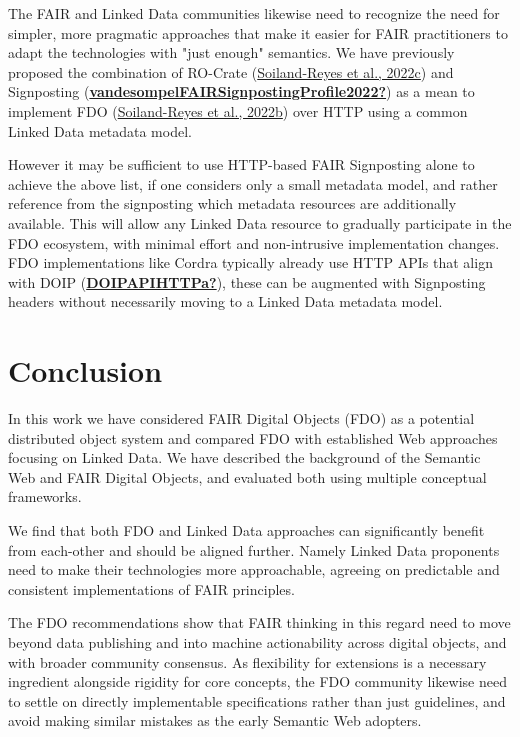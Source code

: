 The FAIR and Linked Data communities likewise need to recognize the need
for simpler, more pragmatic approaches that make it easier for FAIR
practitioners to adapt the technologies with "just enough" semantics.
We have previously proposed the combination of RO-Crate
(\protect\hyperlink{ref-oCW2bFIv}{Soiland-Reyes et al., 2022c}) and Signposting
(\protect\hyperlink{ref-vandesompelFAIRSignpostingProfile2022}{\textbf{vandesompelFAIRSignpostingProfile2022?}}) as a mean to implement FDO
(\protect\hyperlink{ref-1GD9fs68i}{Soiland-Reyes et al., 2022b}) over HTTP using a common Linked Data metadata
model.

However it may be sufficient to use HTTP-based FAIR Signposting alone to
achieve the above list, if one considers only a small metadata model,
and rather reference from the signposting which metadata resources are
additionally available. This will allow any Linked Data resource to
gradually participate in the FDO ecosystem, with minimal effort and
non-intrusive implementation changes. FDO implementations like Cordra
typically already use HTTP APIs that align with DOIP (\protect\hyperlink{ref-DOIPAPIHTTPa}{\textbf{DOIPAPIHTTPa?}}),
these can be augmented with Signposting headers without necessarily
moving to a Linked Data metadata model.

\hypertarget{conclusion}{%
\section{Conclusion}\label{conclusion}}

In this work we have considered FAIR Digital Objects (FDO) as a potential distributed object system and compared FDO with established Web approaches focusing on Linked Data. We have described the background of the Semantic Web and FAIR Digital Objects, and evaluated both using multiple conceptual frameworks.

We find that both FDO and Linked Data approaches can significantly benefit from each-other and should be aligned further. Namely Linked Data proponents need to make their technologies more approachable, agreeing on predictable and consistent implementations of FAIR principles.

The FDO recommendations show that FAIR thinking in this regard need to move beyond data publishing and into machine actionability across digital objects, and with broader community consensus. As flexibility for extensions is a necessary ingredient alongside rigidity for core concepts, the FDO community likewise need to settle on directly implementable specifications rather than just guidelines, and avoid making similar mistakes as the early Semantic Web adopters.

